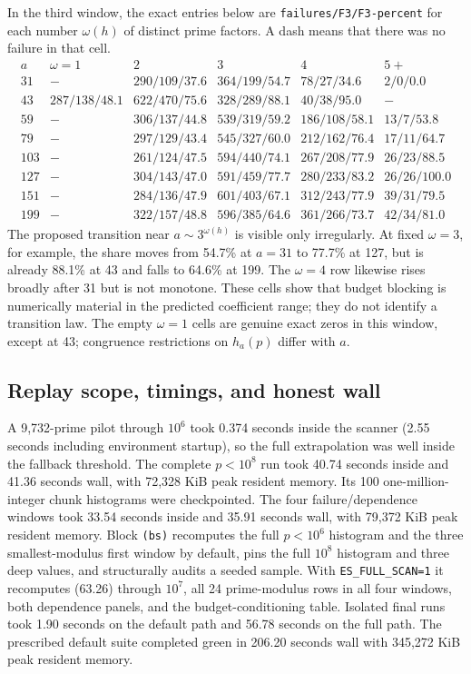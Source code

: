 \documentclass[10pt,reqno]{amsart}
\theoremstyle{definition}
\newcommand{\1}{\mathbf 1}
\begin{document}
In the third window, the exact entries below are \texttt{failures/F3/F3-percent}
for each number $\omega(h)$ of distinct prime factors.  A dash means that
there was no failure in that cell.
\begin{equation}
\begin{array}{r|ccccc}
a&\omega=1&2&3&4&5+\\ \hline
31&-&290/109/37.6&364/199/54.7&78/27/34.6&2/0/0.0\\
43&287/138/48.1&622/470/75.6&328/289/88.1&40/38/95.0&-\\
59&-&306/137/44.8&539/319/59.2&186/108/58.1&13/7/53.8\\
79&-&297/129/43.4&545/327/60.0&212/162/76.4&17/11/64.7\\
103&-&261/124/47.5&594/440/74.1&267/208/77.9&26/23/88.5\\
127&-&304/143/47.0&591/459/77.7&280/233/83.2&26/26/100.0\\
151&-&284/136/47.9&601/403/67.1&312/243/77.9&39/31/79.5\\
199&-&322/157/48.8&596/385/64.6&361/266/73.7&42/34/81.0
\end{array}                                                        \tag{72.12}
\end{equation}
The proposed transition near $a\sim3^{\omega(h)}$ is visible only
irregularly.  At fixed $\omega=3$, for example, the share moves from 54.7\%
at $a=31$ to 77.7\% at 127, but is already 88.1\% at 43 and falls to 64.6\%
at 199.  The $\omega=4$ row likewise rises broadly after 31 but is not
monotone.  These cells show that budget blocking is numerically material in
the predicted coefficient range; they do not identify a transition law.
The empty $\omega=1$ cells are genuine exact zeros in this window, except
at 43; congruence restrictions on $h_a(p)$ differ with $a$.

\subsection{Replay scope, timings, and honest wall}

A 9,732-prime pilot through $10^6$ took 0.374 seconds inside the scanner
(2.55 seconds including environment startup), so the full extrapolation was
well inside the fallback threshold.  The complete $p<10^8$ run took 40.74
seconds inside and 41.36 seconds wall, with 72,328 KiB peak resident memory.
Its 100 one-million-integer chunk histograms were checkpointed.  The four
failure/dependence windows took 33.54 seconds inside and 35.91 seconds wall,
with 79,372 KiB peak resident memory.  Block \texttt{(bs)} recomputes the full
$p<10^6$ histogram and the three smallest-modulus first window by default,
pins the full $10^8$ histogram and three deep values, and structurally
audits a seeded sample.  With \texttt{ES\_FULL\_SCAN=1} it recomputes (63.26) through
$10^7$, all 24 prime-modulus rows in all four windows, both dependence
panels, and the budget-conditioning table.  Isolated final runs took 1.90
seconds on the default path and 56.78 seconds on the full path.  The
prescribed default suite completed green in 206.20 seconds wall with 345,272
KiB peak resident memory.
\end{document}
